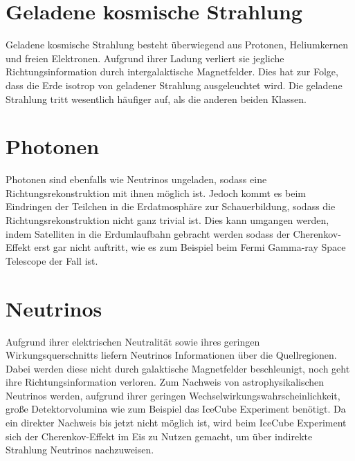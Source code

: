 \section{Geladene kosmische Strahlung}
Geladene kosmische Strahlung besteht überwiegend aus Protonen, Heliumkernen und freien Elektronen. 
Aufgrund ihrer Ladung verliert sie jegliche Richtungsinformation durch intergalaktische Magnetfelder. 
Dies hat zur Folge, dass die Erde isotrop von geladener Strahlung ausgeleuchtet wird.
Die geladene Strahlung tritt wesentlich häufiger auf, als die anderen beiden Klassen. 

\section{Photonen}
Photonen sind ebenfalls wie Neutrinos ungeladen, sodass eine Richtungsrekonstruktion mit ihnen möglich ist. 
Jedoch kommt es beim Eindringen der Teilchen in die Erdatmosphäre zur Schauerbildung, sodass die Richtungsrekonstruktion nicht ganz trivial ist. 
Dies kann umgangen werden, indem Satelliten in die Erdumlaufbahn gebracht werden sodass der Cherenkov-Effekt erst gar nicht auftritt, wie es zum Beispiel beim Fermi Gamma-ray Space Telescope der Fall ist.

\section{Neutrinos}
Aufgrund ihrer elektrischen Neutralität sowie ihres geringen Wirkungsquerschnitts liefern Neutrinos Informationen über die Quellregionen. 
Dabei werden diese nicht durch galaktische Magnetfelder beschleunigt, noch geht ihre Richtungsinformation verloren. 
Zum Nachweis von astrophysikalischen Neutrinos werden, aufgrund ihrer geringen Wechselwirkungswahrscheinlichkeit, große Detektorvolumina wie zum Beispiel das IceCube Experiment benötigt.
Da ein direkter Nachweis bis jetzt nicht möglich ist, wird beim IceCube Experiment sich der Cherenkov-Effekt im Eis zu Nutzen gemacht, um über indirekte Strahlung Neutrinos nachzuweisen.
